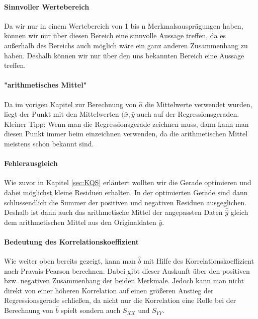 \documentclass[a4paper]{article}
\begin{document}
\paragraph{Sinnvoller Wertebereich} Da wir nur in einem Wertebereich von 1 bis n Merkmalsausprägungen haben, können wir nur über diesen Bereich eine sinnvolle Aussage treffen, da es außerhalb des Bereichs auch möglich wäre ein ganz anderen Zusammenhang zu haben. Deshalb können wir nur über den uns bekannten Bereich eine Aussage treffen. 
\paragraph{"arithmetisches Mittel"} Da im vorigen Kapitel zur Berechnung von $\hat{a}$ die Mittelwerte verwendet wurden, liegt der Punkt mit den Mittelwerten $(\bar{x},\bar{y}$ auch auf der Regressionsgeraden. Kleiner Tipp: Wenn man die Regressionsgerade zeichnen muss, dann kann man diesen Punkt immer beim einzeichnen verwenden, da die arithmetischen Mittel meistens schon bekannt sind.

\paragraph{Fehlerausgleich}Wie zuvor in Kapitel \ref{sec:KQS} erläutert wollten wir die Gerade optimieren und dabei möglichst kleine Residuen erhalten. In der optimierten Gerade sind dann schlussendlich die Summer der positiven und negativen Residuen ausgeglichen. Deshalb ist dann auch das arithmetische Mittel der angepassten Daten $\bar\hat{y}$ gleich dem arithmetischen Mittel aus den Originaldaten $\bar{y}$.

\paragraph{Bedeutung des Korrelationskoeffizient} Wie weiter oben bereits gezeigt, kann man $\hat{b}$ mit Hilfe des Korrelationskoeffizient nach Pravais-Pearson berechnen. Dabei gibt dieser Auskunft über den positiven bzw. negativen Zusammenhang der beiden Merkmale. Jedoch kann man nicht direkt von einer höheren Korrelation auf einen größeren Anstieg der Regressionsgerade schließen, da nicht nur die Korrelation eine Rolle bei der Berechnung von $\hat{b}$ spielt sondern auch $S_{XX}$ und $S_{YY}$.
\end{document}
